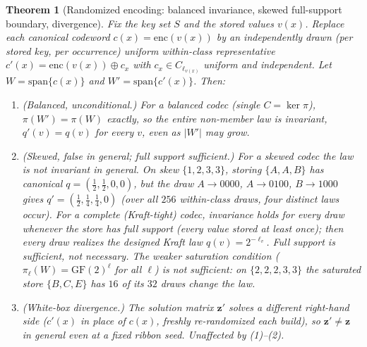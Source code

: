 \documentclass[11pt]{article}
\theoremstyle{definition}
\theoremstyle{plain}
\newtheorem{theorem}{Theorem}[section]
\theoremstyle{remark}
\newcommand{\enc}{\mathrm{enc}}
\newcommand{\GF}{\mathrm{GF}(2)}
\newcommand{\spn}{\mathrm{span}}
\newcommand{\W}{W}                          %
\newcommand{\proj}{\pi}                     %
\newcommand{\bz}{\mathbf{z}}                %
\newcommand{\cx}{c(x)}                      %
\begin{document}
\begin{theorem}[Randomized encoding: balanced invariance, skewed full-support boundary, divergence]
\label{thm:randenc}
Fix the key set $S$ and the stored values $v(x)$. Replace each canonical codeword
$\cx = \enc(v(x))$ by an independently drawn (per stored key, per occurrence) uniform
within-class representative $c'(x) = \enc(v(x)) \oplus c_x$ with $c_x \in C_{\ell_{v(x)}}$
uniform and independent. Let $\W = \spn\{\cx\}$ and $\W' = \spn\{c'(x)\}$. Then:
\begin{enumerate}
  \item \emph{(Balanced, unconditional.)} For a balanced codec (single $C = \ker\proj$),
  $\proj(\W') = \proj(\W)$ exactly, so the \emph{entire} non-member law is invariant,
  $q'(v) = q(v)$ for every $v$, even as $|\W'|$ may grow.
  \item \emph{(Skewed, false in general; full support sufficient.)} For a skewed codec the law
  is \emph{not} invariant in general. On skew $\{1,2,3,3\}$, storing $\{A,A,B\}$ has canonical
  $q = (\tfrac12,\tfrac12,0,0)$, but the draw $A \to 0000$, $A \to 0100$, $B \to 1000$ gives
  $q' = (\tfrac12,\tfrac14,\tfrac14,0)$ (over all $256$ within-class draws, four distinct laws
  occur). For a \emph{complete} (Kraft-tight) codec, invariance holds for \emph{every} draw
  whenever the store has \emph{full support} (every value stored at least once); then every draw
  realizes the designed Kraft law $q(v) = 2^{-\ell_v}$. Full support is sufficient, not necessary.
  The weaker \emph{saturation} condition ($\proj_\ell(\W) = \GF^\ell$ for all $\ell$) is
  \emph{not} sufficient: on $\{2,2,2,3,3\}$ the saturated store $\{B,C,E\}$ has $16$ of its $32$
  draws change the law.
  \item \emph{(White-box divergence.)} The solution matrix $\bz'$ solves a different
  right-hand side ($c'(x)$ in place of $\cx$, freshly re-randomized each build), so
  $\bz' \ne \bz$ in general even at a fixed ribbon seed. Unaffected by (1)--(2).
\end{enumerate}
\end{theorem}
\end{document}
